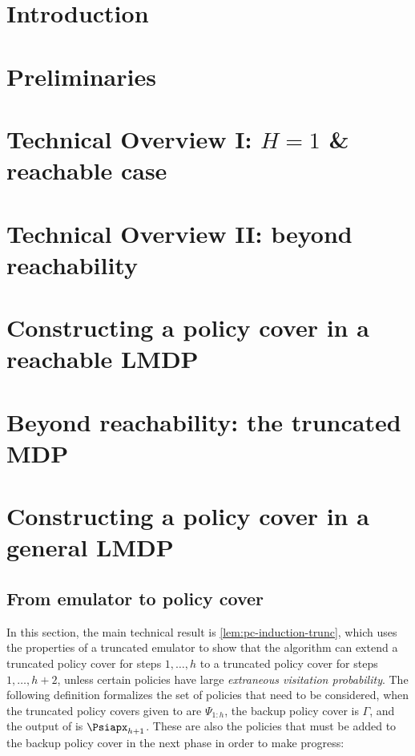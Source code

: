 \documentclass[11pt, oneside]{article}
\theoremstyle{plain}
\theoremstyle{definition}
\numberwithin{theorem}{section}
\newcommand{\trunccore}{truncated emulator\xspace}
\renewcommand{\^}[1]{^{(#1)}}
\begin{document}
\newpage
\tableofcontents
\newpage


\section{Introduction}





\section{Preliminaries}\label{sec:prelim}


\section{Technical Overview I: $H=1$ \& reachable case}\label{sec:overview}


\section{Technical Overview II: beyond reachability}\label{section:trunc-overview}



\section{Constructing a policy cover in a reachable LMDP}
\label{sec:policy-cover-reachable}




\section{Beyond reachability: the truncated MDP}\label{sec:trunc-mdps}


\section{Constructing a policy cover in a general LMDP}
\label{sec:policy-cover-unreachable}





\subsection{From emulator to policy cover}
\label{sec:emulator-pc-unreachable}
In this section, the main technical result is \cref{lem:pc-induction-trunc}, which uses the properties of a \trunccore to show that the \PC algorithm can extend a truncated policy cover for steps $1, \ldots, h$ to a truncated policy cover for steps $1, \ldots, h+2$, unless certain policies have large \emph{extraneous visitation probability}. The following definition formalizes the set of policies that need to be considered, when the truncated policy covers given to \PC are $\Psi_{1:h}$, the backup policy cover is $\Gamma$, and the output of \PC is $\Psiapx_{h+1}$. These are also the policies that must be added to the backup policy cover in the next phase in order to make progress:
\end{document}
